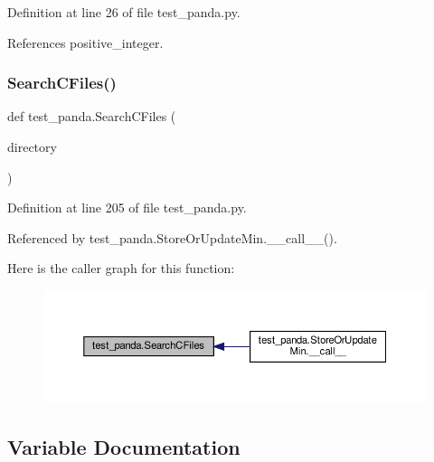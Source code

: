 Definition at line 26 of file test\+\_\+panda.\+py.



References positive\+\_\+integer.

\mbox{\label{namespacetest__panda_a8292fd9f0436c65b76dc0689a5be68c0}} 
\subsubsection{\texorpdfstring{Search\+C\+Files()}{SearchCFiles()}}
{\footnotesize\ttfamily def test\+\_\+panda.\+Search\+C\+Files (\begin{DoxyParamCaption}\item[{}]{directory }\end{DoxyParamCaption})}



Definition at line 205 of file test\+\_\+panda.\+py.



Referenced by test\+\_\+panda.\+Store\+Or\+Update\+Min.\+\_\+\+\_\+call\+\_\+\+\_\+().

Here is the caller graph for this function\+:
\nopagebreak
\begin{figure}[H]
\begin{center}
\leavevmode
\includegraphics[width=350pt]{d0/dee/namespacetest__panda_a8292fd9f0436c65b76dc0689a5be68c0_icgraph}
\end{center}
\end{figure}


\subsection{Variable Documentation}
\mbox{\label{namespacetest__panda_a420b78aa50adb0ce19e2fe6e434faa66}} 
